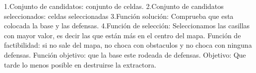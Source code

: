 1.Conjunto de candidatos: conjunto de celdas.
2.Conjunto de candidatos seleccionados: celdas seleccionadas
3.Función solución: Comprueba que esta colocada la base y las defensas.
4.Función de selección: Seleccionamos las casillas con mayor valor, es decir las que están más en el centro del mapa.
Función de factibilidad: si no sale del mapa, no choca con obstaculos y no choca con ninguna defensas.
Función objetivo: que la base este rodeada de defensas.
Objetivo: Que tarde lo menos posible en destruirse la extractora.
